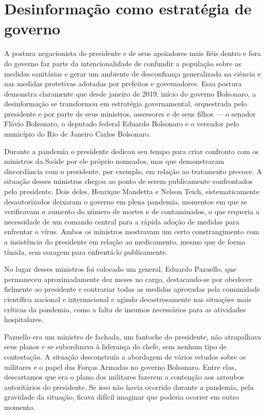 \section{Desinformação como estratégia de governo}

A postura negacionista do presidente e de seus apoiadores mais fiéis
dentro e fora do governo faz parte da intencionalidade de confundir a
população sobre as medidas sanitárias e gerar um ambiente de
desconfiança generalizada na ciência e nas medidas protetivas adotadas
por prefeitos e governadores. Essa postura demonstra claramente que
desde janeiro de 2019, início do governo Bolsonaro, a desinformação se
transformou em estratégia governamental, orquestrada pelo presidente e
por parte de seus ministros, assessores e de seus filhos --- o senador
Flávio Bolsonaro, o deputado federal Eduardo Bolsonaro e o vereador pelo
município do Rio de Janeiro Carlos Bolsonaro.

Durante a pandemia o presidente dedicou seu tempo para criar confronto
com os ministros da Saúde por ele próprio nomeados, mas que demonstraram
discordância com o presidente, por exemplo, em relação ao tratamento
precoce. A situação desses ministros chegou ao ponto de serem
publicamente confrontados pelo presidente. Dois deles, Henrique Mandetta
e Nelson Teich, sistematicamente desautorizados deixaram o governo em
plena pandemia, momentos em que se verificavam o aumento do número de
mortes e de contaminados, o que requeria a necessidade de um comando
central para a rápida adoção de medidas para enfrentar o vírus. Ambos os
ministros mostravam um certo constrangimento com a insistência do
presidente em relação ao medicamento, mesmo que de forma tímida, sem
coragem para enfrentá-lo publicamente.

No lugar desses ministros foi colocado um general, Eduardo Pazuello, que
permaneceu aproximadamente dez meses no cargo, destacando-se por
obedecer fielmente ao presidente e contrariar todas as medidas aprovadas
pela comunidade científica nacional e internacional e agindo
desastrosamente nas situações mais críticas da pandemia, como a falta de
insumos necessários para as atividades hospitalares.

Pazuello era um ministro de fachada, um fantoche do presidente, não
atrapalhava seus planos e se subordinava à liderança do chefe, sem
nenhum tipo de contestação. A situação desconstruía a abordagem de
vários estudos sobre os militares e o papel das Forças Armadas no
governo Bolsonaro. Entre elas, descartamos que era o plano dos militares
fazerem a contenção aos arroubos autoritários do presidente. Se isso não
havia ocorrido durante a pandemia, pela gravidade da situação, ficava
difícil imaginar que poderia ocorrer em outro momento.


